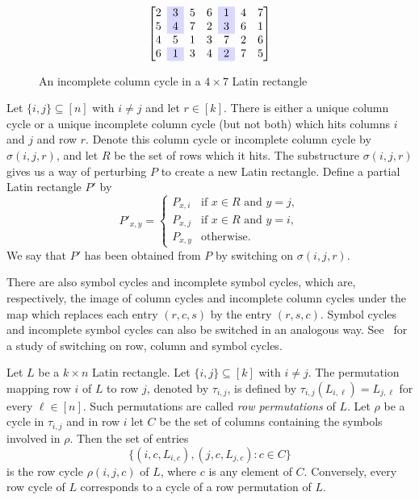 \documentclass[12pt]{article}
\theoremstyle{definition}
\numberwithin{equation}{section}
\begin{document}
	\begin{figure}
		\[\left[
		\begin{matrix}
			2&\cellcolor{blue!15}3&5&6&\cellcolor{blue!15}1&4&7\\
			5&\cellcolor{blue!15}4&7&2&\cellcolor{blue!15}3&6&1\\
			4&5&1&3&7&2&6\\
			6&\cellcolor{blue!15}1&3&4&\cellcolor{blue!15}2&7&5	
		\end{matrix}
		\right]
		\]
		\caption{\label{f:colpath}An incomplete column cycle in a $4 \times 7$
			Latin rectangle}
	\end{figure}
	
	Let $\{i, j\} \subseteq [n]$ with $i \neq j$ and let $r\in[k]$. There
	is either a unique column cycle or a unique incomplete column cycle
	(but not both) which hits columns $i$ and $j$ and row $r$. Denote this
	column cycle or incomplete column cycle by $\sigma(i, j, r)$, and let
	$R$ be the set of rows which it hits. The substructure $\sigma(i,j,r)$
	gives us a way of perturbing $P$ to create a new Latin
	rectangle. Define a partial Latin rectangle $P'$ by
	\[
	P'_{x, y} = \begin{cases}
		P_{x, i} & \text{if } x \in R \text{ and } y = j, \\
		P_{x, j} & \text{if } x \in R \text{ and } y = i, \\
		P_{x, y} & \text{otherwise}.
	\end{cases}
	\]
	We say that $P'$ has been obtained from $P$ by switching on $\sigma(i, j, r)$.
	
	There are also symbol cycles and incomplete symbol cycles, which are,
	respectively, the image of column cycles and incomplete column cycles
	under the map which replaces each entry $(r,c,s)$ by the entry
	$(r,s,c)$.  Symbol cycles and incomplete symbol cycles can also be
	switched in an analogous way.  See~\cite{cycswitch} for a study of
	switching on row, column and symbol cycles.
	
	
	Let $L$ be a $k \times n$ Latin rectangle. Let $\{i, j\} \subseteq [k]$ with $i \neq j$. The permutation mapping row $i$ of $L$ to row $j$, denoted by $\tau_{i, j}$, is defined by $\tau_{i, j}(L_{i, \ell}) = L_{j, \ell}$ for every $\ell \in [n]$. Such permutations are called \emph{row permutations} of $L$. Let $\rho$ be a cycle in $\tau_{i, j}$ and in row $i$ let $C$ be the set of columns containing the symbols involved in $\rho$. Then the set of entries 
	\[
	\{(i, c, L_{i, c}), (j, c, L_{j, c}) : c \in C\}
	\]
	is the row cycle $\rho(i, j, c)$ of $L$, where $c$ is any element of $C$. Conversely, every row cycle of $L$ corresponds to a cycle of a row permutation of $L$. 
	
\end{document}
